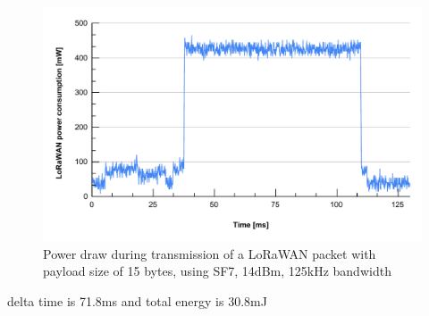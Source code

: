 \begin{figure}[ht]
    \centering
    \includegraphics[width=1.0\textwidth]{images/lorawan_SF7_14dbm_125khz_power.pdf}
    \caption{Power draw during transmission of a LoRaWAN packet with payload size of 15 bytes, using SF7, 14dBm, 125kHz bandwidth}
    \label{LoRaWAN SF7}
\end{figure}
delta time is 71.8ms and total energy is 30.8mJ
